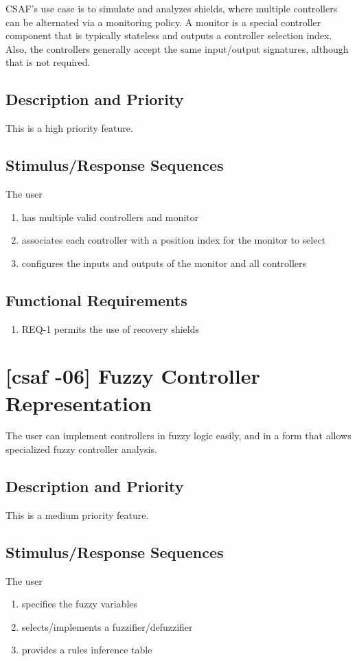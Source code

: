 CSAF's use case is to simulate and analyzes shields, where multiple controllers can be alternated via a 
monitoring policy. A monitor is a special controller component that is typically stateless and outputs a 
controller selection index. Also, the controllers generally accept the same input/output signatures, although 
that is not required. 

\subsection{Description and Priority}
This is a high priority feature.

\subsection{Stimulus/Response Sequences}
The user
\begin{enumerate}
\item has multiple valid controllers and monitor
\item associates each controller with a position index for the monitor to select 
\item  configures the inputs and outputs of the monitor and all controllers
\end{enumerate}

\subsection{Functional Requirements}
\begin{enumerate}
\item REQ-1 \quad permits the use of recovery shields
\end{enumerate}

\section{[\acrshort{csaf} -06] Fuzzy Controller Representation}

The user can implement controllers in fuzzy logic easily, and in a form that allows specialized fuzzy controller analysis. 

\subsection{Description and Priority}
This is a medium priority feature.

\subsection{Stimulus/Response Sequences}
The user
\begin{enumerate}
\item specifies the fuzzy variables
\item selects/implements a fuzzifier/defuzzifier
\item provides a rules inference table
\end{enumerate}


